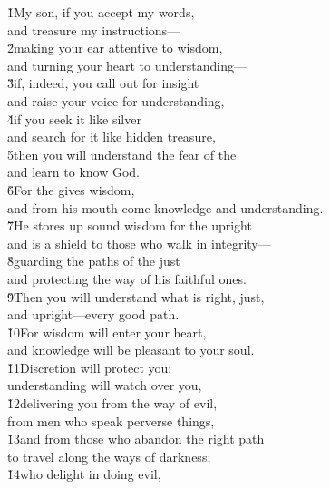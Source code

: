 \begin{poetry}
\poeml {}
\v{1}My son, if you accept my words, \\
\poeml and treasure my instructions--- \\
\poeml \v{2}making your ear attentive to wisdom, \\
\poemll    and turning your heart to understanding--- \\
\poeml \v{3}if, indeed, you call out for insight \\
\poemll    and raise your voice for understanding, \\
\poeml \v{4}if you seek it like silver \\
\poemll    and search for it like hidden treasure, \\
\poeml \v{5}then you will understand the fear of the  \\
\poemll    and learn to know God. \\
\poeml \v{6}For the  gives wisdom, \\
\poemll    and from his mouth come knowledge and understanding. \\
\poeml \v{7}He stores up sound wisdom for the upright \\
\poemll    and is a shield to those who walk in integrity--- \\
\poeml \v{8}guarding the paths of the just \\
\poemll    and protecting the way of his faithful ones. \\
\poeml \v{9}Then you will understand what is right, just, \\
\poemll    and upright---every good path. \\
\poeml \v{10}For wisdom will enter your heart, \\
\poemll    and knowledge will be pleasant to your soul. \\
\poeml \v{11}Discretion will protect you; \\
\poemll    understanding will watch over you, \\
\poeml \v{12}delivering you from the way of evil, \\
\poemll    from men who speak perverse things, \\
\poeml \v{13}and from those who abandon the right path \\
\poemll    to travel along the ways of darkness; \\
\poeml \v{14}who delight in doing evil, \\

\end{poetry}
